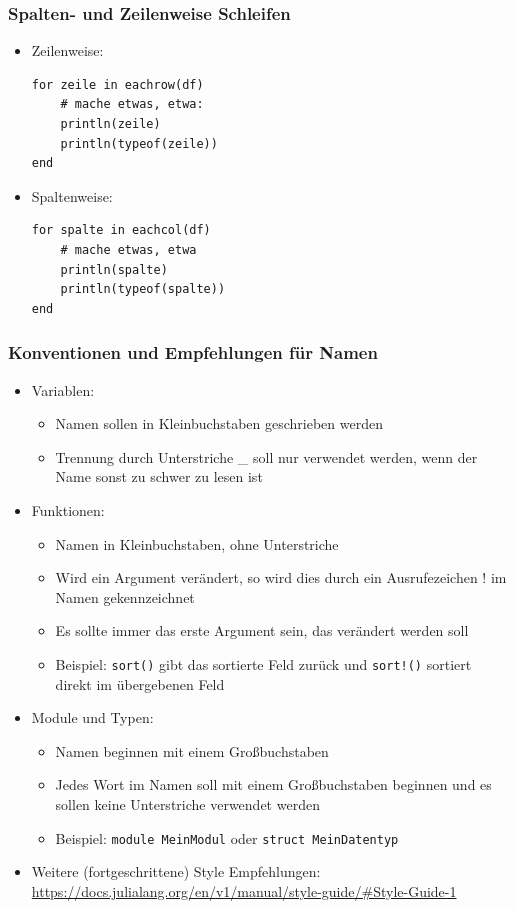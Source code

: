 \begin{frame}[fragile]
\frametitle{Spalten- und Zeilenweise Schleifen}
\begin{itemize}[<+->]
\item Zeilenweise:
\begin{verbatim}
for zeile in eachrow(df)
    # mache etwas, etwa:
    println(zeile)
    println(typeof(zeile))
end
\end{verbatim}
\item Spaltenweise:
\begin{verbatim}
for spalte in eachcol(df)
    # mache etwas, etwa
    println(spalte)
    println(typeof(spalte))
end
\end{verbatim}
\end{itemize}
\end{frame}
\begin{frame}[fragile]
\frametitle{Konventionen und Empfehlungen für Namen}
\begin{itemize}[<+->]
\item Variablen:
\begin{itemize}
\item Namen sollen in Kleinbuchstaben geschrieben werden
\item Trennung durch Unterstriche \_ soll nur verwendet werden, wenn der Name sonst zu schwer zu lesen ist
\end{itemize}
\item Funktionen:
\begin{itemize}
\item Namen in Kleinbuchstaben, ohne Unterstriche
\item Wird ein Argument verändert, so wird dies durch ein Ausrufezeichen ! im Namen gekennzeichnet
\item Es sollte immer das erste Argument sein, das verändert werden soll
\item Beispiel: \verb+sort()+ gibt das sortierte Feld zurück und \verb+sort!()+ sortiert direkt im übergebenen Feld
\end{itemize}
\item Module und Typen:
\begin{itemize}
\item Namen beginnen mit einem Großbuchstaben
\item Jedes Wort im Namen soll mit einem Großbuchstaben beginnen und es sollen keine Unterstriche verwendet werden
\item Beispiel: \verb+module MeinModul+  oder  \verb+struct MeinDatentyp+
\end{itemize}
\item Weitere (fortgeschrittene) Style Empfehlungen: \url{https://docs.julialang.org/en/v1/manual/style-guide/#Style-Guide-1}
\end{itemize}
\end{frame}